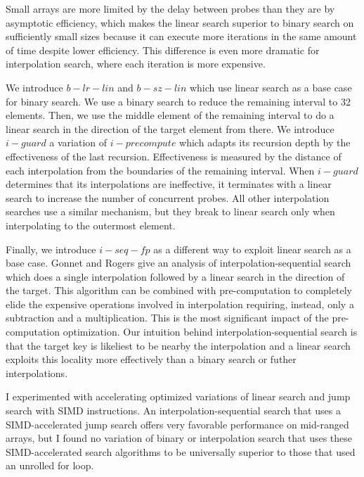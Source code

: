 \documentclass[twocolumn]{article}
\begin{document}
Small arrays are more limited by the delay between probes than they are by asymptotic efficiency, which makes the linear search superior to binary search on sufficiently small sizes because it can execute more iterations in the same amount of time despite lower efficiency. This difference is even more dramatic for interpolation search, where each iteration is more expensive.

We introduce $b-lr-lin$ and $b-sz-lin$ which use linear search as a base case for binary search. We use a binary search to reduce the remaining interval to 32 elements. Then, we use the middle element of the remaining interval to do a linear search in the direction of the target element from there. We introduce $i-guard$ a variation of $i-precompute$ which adapts its recursion depth by the effectiveness of the last recursion. Effectiveness is measured by the distance of each interpolation from the boundaries of the remaining interval. When $i-guard$ determines that its interpolations are ineffective, it terminates with a linear search to increase the number of concurrent probes. All other interpolation searches use a similar mechanism, but they break to linear search only when interpolating to the outermost element.

Finally, we introduce $i-seq-fp$ as a different way to exploit linear search as a base case. Gonnet and Rogers \cite{gonnet-rogers} give an analysis of interpolation-sequential search which does a single interpolation followed by a linear search in the direction of the target. This algorithm can be combined with pre-computation to completely elide the expensive operations involved in interpolation requiring, instead, only a subtraction and a multiplication. This is the most significant impact of the pre-computation optimization. Our intuition behind interpolation-sequential search is that the target key is likeliest to be nearby the interpolation and a linear search exploits this locality more effectively than a binary search or futher interpolations.

I experimented with accelerating optimized variations of linear search and jump search \cite{jump-search} with SIMD instructions. An interpolation-sequential search that uses a SIMD-accelerated jump search offers very favorable performance on mid-ranged arrays, but I found no variation of binary or interpolation search that uses these SIMD-accelerated search algorithms to be universally superior to those that used an unrolled for loop.
\end{document}
